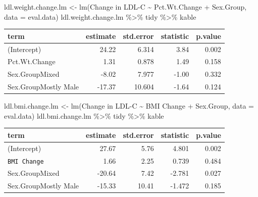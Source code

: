 \documentclass[
]{article}
\newenvironment{Shaded}{\begin{snugshade}}{\end{snugshade}}
\newcommand{\AttributeTok}[1]{\textcolor[rgb]{0.77,0.63,0.00}{#1}}
\newcommand{\FunctionTok}[1]{\textcolor[rgb]{0.00,0.00,0.00}{#1}}
\newcommand{\NormalTok}[1]{#1}
\newcommand{\OtherTok}[1]{\textcolor[rgb]{0.56,0.35,0.01}{#1}}
\newcommand{\SpecialCharTok}[1]{\textcolor[rgb]{0.00,0.00,0.00}{#1}}
\newcommand{\StringTok}[1]{\textcolor[rgb]{0.31,0.60,0.02}{#1}}
\begin{document}
\begin{Shaded}
\begin{Highlighting}[]
\NormalTok{ldl.weight.change.lm }\OtherTok{\textless{}{-}} \FunctionTok{lm}\NormalTok{(}\StringTok{\textasciigrave{}}\AttributeTok{Change in LDL{-}C}\StringTok{\textasciigrave{}} \SpecialCharTok{\textasciitilde{}} \StringTok{\textasciigrave{}}\AttributeTok{Pct.Wt.Change}\StringTok{\textasciigrave{}} \SpecialCharTok{+} \StringTok{\textasciigrave{}}\AttributeTok{Sex.Group}\StringTok{\textasciigrave{}}\NormalTok{, }\AttributeTok{data =}\NormalTok{ eval.data)}
\NormalTok{ldl.weight.change.lm }\SpecialCharTok{\%\textgreater{}\%}\NormalTok{ tidy }\SpecialCharTok{\%\textgreater{}\%}\NormalTok{ kable}
\end{Highlighting}
\end{Shaded}

\begin{longtable}[]{@{}lrrrr@{}}
\toprule
term & estimate & std.error & statistic & p.value \\
\midrule
\endhead
(Intercept) & 24.22 & 6.314 & 3.84 & 0.002 \\
Pct.Wt.Change & 1.31 & 0.878 & 1.49 & 0.158 \\
Sex.GroupMixed & -8.02 & 7.977 & -1.00 & 0.332 \\
Sex.GroupMostly Male & -17.37 & 10.604 & -1.64 & 0.124 \\
\bottomrule
\end{longtable}

\begin{Shaded}
\begin{Highlighting}[]
\NormalTok{ldl.bmi.change.lm }\OtherTok{\textless{}{-}} \FunctionTok{lm}\NormalTok{(}\StringTok{\textasciigrave{}}\AttributeTok{Change in LDL{-}C}\StringTok{\textasciigrave{}} \SpecialCharTok{\textasciitilde{}} \StringTok{\textasciigrave{}}\AttributeTok{BMI Change}\StringTok{\textasciigrave{}} \SpecialCharTok{+} \StringTok{\textasciigrave{}}\AttributeTok{Sex.Group}\StringTok{\textasciigrave{}}\NormalTok{, }\AttributeTok{data =}\NormalTok{ eval.data)}
\NormalTok{ldl.bmi.change.lm }\SpecialCharTok{\%\textgreater{}\%}\NormalTok{ tidy }\SpecialCharTok{\%\textgreater{}\%}\NormalTok{ kable}
\end{Highlighting}
\end{Shaded}

\begin{longtable}[]{@{}lrrrr@{}}
\toprule
term & estimate & std.error & statistic & p.value \\
\midrule
\endhead
(Intercept) & 27.67 & 5.76 & 4.801 & 0.002 \\
\texttt{BMI\ Change} & 1.66 & 2.25 & 0.739 & 0.484 \\
Sex.GroupMixed & -20.64 & 7.42 & -2.781 & 0.027 \\
Sex.GroupMostly Male & -15.33 & 10.41 & -1.472 & 0.185 \\
\bottomrule
\end{longtable}
\end{document}
